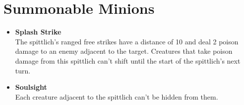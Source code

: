 \documentclass[letterpaper,openany,twoside,twocolumn]{book}
\begin{document}
	\chapter*{Summonable Minions}	
	\begin{DsMinion}
		\DsMinionInformation[
			name			= {Archer Spittlich},
			type			= {Abyssal, Demon},
			specification	= {Minion Artillery},
			cost			= {3 Essence for 2 Minions}
		]
		
		\DsMinionBasics[
			size		= {1S},
			speed		= {5},
			stamina		= {8},
			stability	= {3},
			free-strike	= {5},
			weakness	= {Holy 1},
			damage-type	= {Poison}
		]
		
		\DsMinionStats[
			might		= 0,
			agility		= +2,
			reason		= -1,
			intuition	= -1,
			presence	= 0
		]
		
		\begin{itemize}
			\item[\dsglyphs *] \textbf{Splash Strike}\\The spittlich's ranged free strikes have a distance of 10 and deal 2 poison damage to an enemy adjacent to the target. Creatures that take poison damage from this spittlich can't shift until the start of the spittlich's next turn.
			\item[\dsglyphs *] \textbf{Soulsight}\\Each creature adjacent to the spittlich can't be hidden from them.
		\end{itemize}
	\end{DsMinion}
	
\end{document}
